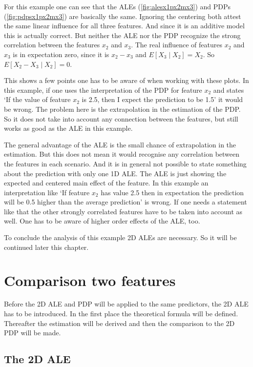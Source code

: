 \documentclass[
]{krantz}
\begin{document}
For this example one can see that the ALEs (\ref{fig:alesx1px2mx3}) and PDPs (\ref{fig:pdpsx1px2mx3}) are basically the same. Ignoring the centering both attest the same linear influence for all three features. And since it is an additive model this is actually correct. But neither the ALE nor the PDP recognize the strong correlation between the features \(x_2\) and \(x_3\). The real influence of features \(x_2\) and \(x_3\) is in expectation zero, since it is \(x_2 - x_3\) and \(E[X_3 \mid X_2] = X_2\). So \(E[X_2 - X_3 \mid X_2] = 0\).

This shows a few points one has to be aware of when working with these plots.
In this example, if one uses the interpretation of the PDP for feature \(x_2\) and states `If the value of feature \(x_2\) is 2.5, then I expect the prediction to be 1.5' it would be wrong. The problem here is the extrapolation in the estimation of the PDP. So it does not take into account any connection between the features, but still works as good as the ALE in this example.

The general advantage of the ALE is the small chance of extrapolation in the estimation. But this does not mean it would recognise any correlation between the features in each scenario. And it is in general not possible to state something about the prediction with only one 1D ALE. The ALE is just showing the expected and centered main effect of the feature. In this example an interpretation like `If feature \(x_2\) has value 2.5 then in expectation the prediction will be 0.5 higher than the average prediction' is wrong. If one needs a statement like that the other strongly correlated features have to be taken into account as well. One has to be aware of higher order effects of the ALE, too.

To conclude the analysis of this example 2D ALEs are necessary. So it will be continued later this chapter.

\hypertarget{comparison-two-features}{%
\section{Comparison two features}\label{comparison-two-features}}

Before the 2D ALE and PDP will be applied to the same predictors, the 2D ALE has to be introduced. In the first place the theoretical formula will be defined. Thereafter the estimation will be derived and then the comparison to the 2D PDP will be made.

\hypertarget{the-2d-ale}{%
\subsection{The 2D ALE}\label{the-2d-ale}}
\end{document}
